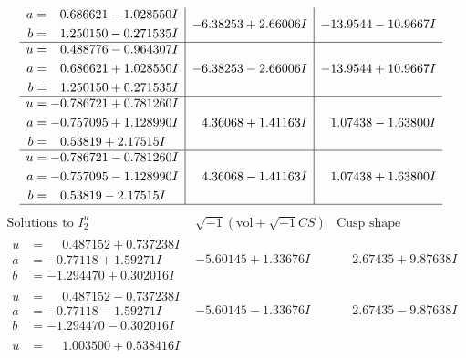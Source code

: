 \documentclass[1p]{elsarticle_modified}
\theoremstyle{definition}
\newcommand{\I}{\sqrt{-1}}
\begin{document}
$$\begin{array}{c|c|c}
\begin{aligned}
a &= \phantom{-}0.686621 - 1.028550 I \\
b &= \phantom{-}1.250150 - 0.271535 I\end{aligned}
 & -6.38253 + 2.66006 I & -13.9544 - 10.9667 I \\ \hline\begin{aligned}
u &= \phantom{-}0.488776 - 0.964307 I \\
a &= \phantom{-}0.686621 + 1.028550 I \\
b &= \phantom{-}1.250150 + 0.271535 I\end{aligned}
 & -6.38253 - 2.66006 I & -13.9544 + 10.9667 I \\ \hline\begin{aligned}
u &= -0.786721 + 0.781260 I \\
a &= -0.757095 + 1.128990 I \\
b &= \phantom{-}0.53819 + 2.17515 I\end{aligned}
 & \phantom{-}4.36068 + 1.41163 I & \phantom{-}1.07438 - 1.63800 I \\ \hline\begin{aligned}
u &= -0.786721 - 0.781260 I \\
a &= -0.757095 - 1.128990 I \\
b &= \phantom{-}0.53819 - 2.17515 I\end{aligned}
 & \phantom{-}4.36068 - 1.41163 I & \phantom{-}1.07438 + 1.63800 I\\
 \hline 
 \end{array}$$\newpage$$\begin{array}{c|c|c}  
\text{Solutions to }I^u_{2}& \I (\text{vol} + \sqrt{-1}CS) & \text{Cusp shape}\\
 \hline 
\begin{aligned}
u &= \phantom{-}0.487152 + 0.737238 I \\
a &= -0.77118 + 1.59271 I \\
b &= -1.294470 + 0.302016 I\end{aligned}
 & -5.60145 + 1.33676 I & \phantom{-}2.67435 + 9.87638 I \\ \hline\begin{aligned}
u &= \phantom{-}0.487152 - 0.737238 I \\
a &= -0.77118 - 1.59271 I \\
b &= -1.294470 - 0.302016 I\end{aligned}
 & -5.60145 - 1.33676 I & \phantom{-}2.67435 - 9.87638 I \\ \hline\begin{aligned}
u &= \phantom{-}1.003500 + 0.538416 I \\

\end{aligned}
\end{array}$$
\end{document}
